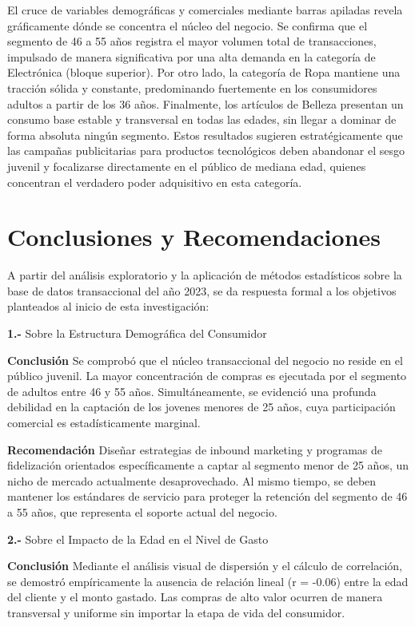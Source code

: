 \documentclass[oneside,11pt]{Latex/Classes/PhDthesisPSnPDF}
\begin{document}
El cruce de variables demográficas y comerciales mediante barras
apiladas revela gráficamente dónde se concentra el núcleo del negocio.
Se confirma que el segmento de 46 a 55 años registra el mayor volumen
total de transacciones, impulsado de manera significativa por una alta
demanda en la categoría de Electrónica (bloque superior). Por otro lado,
la categoría de Ropa mantiene una tracción sólida y constante,
predominando fuertemente en los consumidores adultos a partir de los 36
años. Finalmente, los artículos de Belleza presentan un consumo base
estable y transversal en todas las edades, sin llegar a dominar de forma
absoluta ningún segmento. Estos resultados sugieren estratégicamente que
las campañas publicitarias para productos tecnológicos deben abandonar
el sesgo juvenil y focalizarse directamente en el público de mediana
edad, quienes concentran el verdadero poder adquisitivo en esta
categoría.

\chapter{Conclusiones y Recomendaciones}

A partir del análisis exploratorio y la aplicación de métodos
estadísticos sobre la base de datos transaccional del año 2023, se da
respuesta formal a los objetivos planteados al inicio de esta
investigación:

\textbf{1.-} Sobre la Estructura Demográfica del Consumidor

\textbf{Conclusión} Se comprobó que el núcleo transaccional del negocio
no reside en el público juvenil. La mayor concentración de compras es
ejecutada por el segmento de adultos entre 46 y 55 años.
Simultáneamente, se evidenció una profunda debilidad en la captación de
los jovenes menores de 25 años, cuya participación comercial es
estadísticamente marginal.

\textbf{Recomendación} Diseñar estrategias de inbound marketing y
programas de fidelización orientados específicamente a captar al
segmento menor de 25 años, un nicho de mercado actualmente
desaprovechado. Al mismo tiempo, se deben mantener los estándares de
servicio para proteger la retención del segmento de 46 a 55 años, que
representa el soporte actual del negocio.

\textbf{2.-} Sobre el Impacto de la Edad en el Nivel de Gasto

\textbf{Conclusión} Mediante el análisis visual de dispersión y el
cálculo de correlación, se demostró empíricamente la ausencia de
relación lineal (r = -0.06) entre la edad del cliente y el monto
gastado. Las compras de alto valor ocurren de manera transversal y
uniforme sin importar la etapa de vida del consumidor.
\end{document}
